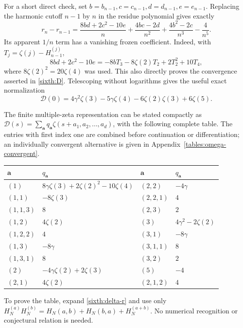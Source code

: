 For a short direct check, set $b=b_{n-1},c=c_{n-1},d=d_{n-1},e=e_{n-1}$.
Replacing the harmonic cutoff $n-1$ by $n$ in the residue polynomial
gives exactly
\begin{equation}\label{sixth:delta-r}
 r_n-r_{n-1}=
 \frac{8bd+2c^2-10e}{n}
 +\frac{4bc-2d}{n^2}
 +\frac{4b^2-2c}{n^3}-\frac4{n^5}.
\end{equation}
Its apparent $1/n$ term has a vanishing frozen coefficient.
Indeed, with $T_j=\zeta(j)-H_{n-1}^{(j)}$,
\begin{equation}\label{sixth:tail-cancel}
 8bd+2c^2-10e=-8bT_3-8\zeta(2)T_2+2T_2^2+10T_4,
\end{equation}
where $8\zeta(2)^2=20\zeta(4)$ was used.
This also directly proves the convergence asserted in
\eqref{sixth:D}.
Telescoping without logarithms gives the useful exact normalization
\begin{equation}\label{sixth:Dzero}
 \mathcal D(0)=4\gamma^2\zeta(3)-5\gamma\zeta(4)
                 -6\zeta(2)\zeta(3)+6\zeta(5).
\end{equation}

The finite multiple-zeta representation can be stated compactly as
$\mathcal D(s)=\sum_{\boldsymbol a}q_{\boldsymbol a}
\zeta(s+a_1,a_2,\ldots,a_d)$, with the following complete table.
The entries with first index one are combined before continuation
or differentiation; an individually convergent alternative is given
in Appendix~\ref{tables:omega-convergent}.

\begin{center}
\small
\begin{tabular}{@{}ll@{\qquad}ll@{}}
\toprule
$\boldsymbol a$ & $q_{\boldsymbol a}$ & $\boldsymbol a$ & $q_{\boldsymbol a}$\\
\midrule
$(1)$ & $8\gamma\zeta(3)+2\zeta(2)^2-10\zeta(4)$
 & $(2,2)$ & $-4\gamma$\\
$(1,1)$ & $-8\zeta(3)$ & $(2,2,1)$ & $4$\\
$(1,1,3)$ & $8$ & $(2,3)$ & $2$\\
$(1,2)$ & $4\zeta(2)$ & $(3)$ & $4\gamma^2-2\zeta(2)$\\
$(1,2,2)$ & $4$ & $(3,1)$ & $-8\gamma$\\
$(1,3)$ & $-8\gamma$ & $(3,1,1)$ & $8$\\
$(1,3,1)$ & $8$ & $(3,2)$ & $2$\\
$(2)$ & $-4\gamma\zeta(2)+2\zeta(3)$ & $(5)$ & $-4$\\
$(2,1)$ & $4\zeta(2)$ & $(2,1,2)$ & $4$\\
\bottomrule
\end{tabular}
\end{center}
To prove the table, expand \eqref{sixth:delta-r} and use only
$H_N^{(a)}H_N^{(b)}=H_N(a,b)+H_N(b,a)+H_N^{(a+b)}$.
No numerical recognition or conjectural relation is needed.

